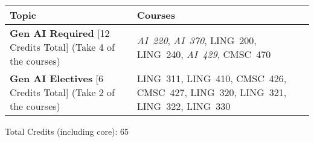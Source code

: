 \begin{longtable}{p{7cm}>{\raggedleft\arraybackslash}p{7cm}}
Topic & Courses \\
\toprule
\textbf{Gen AI Required} [12 Credits Total] (Take 4 of the courses) & \textit{AI~220}, \textit{AI~370}, LING~200, LING~240, \textit{AI~429}, CMSC~470 \\
\textbf{Gen AI Electives} [6 Credits Total] (Take 2 of the courses) & LING~311, LING~410, CMSC~426, CMSC~427, LING~320, LING~321, LING~322, LING~330 \\
\bottomrule
\end{longtable}
Total Credits (including core): 65
